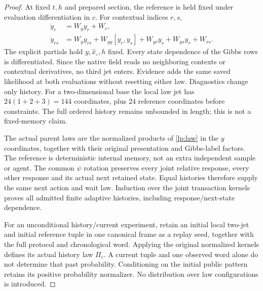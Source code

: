 \begin{proof}
At fixed $t,h$ and prepared section, the reference is held fixed under evaluation differentiation in $c$. For contextual indices $r,s$,
\begin{equation}
 \begin{aligned}
 \dot y_r&=W_y y_r+W_r,\\
 \dot y_{rs}&=W_y y_{rs}+W_{yy}[y_r,y_s]
 +W_{yr}y_s+W_{ys}y_r+W_{rs}.
 \end{aligned}
 \label{lp:jet-flow}
\end{equation}
The explicit partials hold $y,\widehat x_\circ,h$ fixed. Every state dependence of the Gibbs rows is differentiated. Since the native field reads no neighboring contexts or contextual derivatives, no third jet enters. Evidence adds the same saved likelihood at both evaluations without resetting either law. Diagnostics change only history. For a two-dimensional base the local law jet has $24(1+2+3)=144$ coordinates, plus 24 reference coordinates before constraints. The full ordered history remains unbounded in length; this is not a fixed-memory claim.

The actual parent laws are the normalized products of \cref{lp:law} in the $y$ coordinates, together with their original presentation and Gibbs-label factors. The reference is deterministic internal memory, not an extra independent sample or agent. The common $\psi$ rotation preserves every joint relative response, every other response and its actual next retained state. Equal histories therefore supply the same next action and wait law. Induction over the joint transaction kernels proves all admitted finite adaptive histories, including response/next-state dependence.

For an unconditional history/current experiment, retain an initial local two-jet and initial reference tuple in one canonical frame as a replay seed, together with the full protocol and chronological word. Applying the original normalized kernels defines its actual history law $\Pi_c$. A current tuple and one observed word alone do not determine that past probability. Conditioning on the initial public pattern retains its positive probability normalizer. No distribution over law configurations is introduced.


\end{proof}
